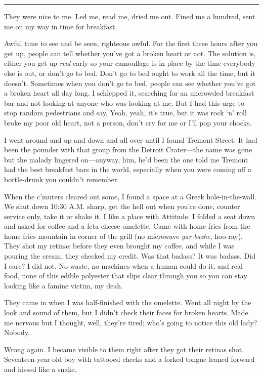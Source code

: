 \fancybreak{* * *}

They were nice to me. Led me, read me, dried me out. Fined me a hundred, sent me on my way in time for breakfast.

Awful time to see and be seen, righteous awful. For the first three hours after you get up, people can tell whether you've got a broken heart or not. The solution is, either you get up \textit{real} early so your camouflage is in place by the time everybody else is out, or don't go to bed. Don't go to bed ought to work all the time, but it doesn't. Sometimes when you don't go to bed, people can see whether you've got a broken heart all day long. I schlepped it, searching for an uncrowded breakfast bar and not looking at anyone who was looking at me. But I had this urge to stop random pedestrians and say, Yeah, yeah, it's true, but it was rock `n' roll broke my poor old heart, not a person, don't cry for me or I'll pop your chocks.

I went around and up and down and all over until I found Tremont Street. It had been the pounder with that group from the Detroit Crater—the name was gone but the malady lingered on—anyway, him, he'd been the one told me Tremont had the best breakfast bars in the world, especially when you were coming off a bottle-drunk you couldn't remember.

When the c'muters cleared out some, I found a space at a Greek hole-in-the-wall. We shut down 10:30 A.M. sharp, get the hell out when you're done, counter service only, take it or shake it. I like a place with Attitude. I folded a seat down and asked for coffee and a feta cheese omelette. Came with home fries from the home fries mountain in corner of the grill (no microwave \textit{gar-bazhe}, hoo-ray). They shot my retinas before they even brought my coffee, and while I was pouring the cream, they checked my credit. Was that badass? It was badass. Did I care? I did not. No waste, no machines when a human could do it, and real food, none of this edible polyester that slips clear through you so you can stay looking like a famine victim, my deah.

They came in when I was half-finished with the omelette. Went all night by the look and sound of them, but I didn't check their faces for broken hearts. Made me nervous but I thought, well, they're tired; who's going to notice this old lady? Nobody.

Wrong again. I became visible to them right after they got their retinas shot. Seventeen-year-old boy with tattooed cheeks and a forked tongue leaned forward and hissed like a snake.

